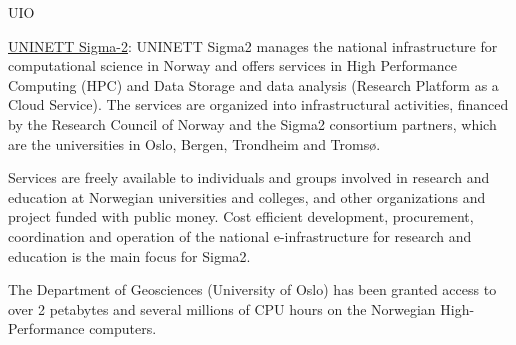 \begin{sitedescription}{UIO}
\begin{compactenum}
\item \href{https://sigma2.no}{UNINETT Sigma-2}: UNINETT Sigma2 manages the national infrastructure for computational science in Norway and offers services in High Performance Computing (HPC) and Data Storage and data analysis (Research Platform as a Cloud Service). The services are organized into infrastructural activities, financed by the Research Council of Norway and the Sigma2 consortium partners, which are the universities in Oslo, Bergen, Trondheim and Tromsø.

Services are freely available to individuals and groups involved in  research and education at Norwegian universities and colleges, and other organizations and project funded with public money. Cost efficient development, procurement, coordination and operation of the national e-infrastructure for research and education is the main focus for Sigma2.

The Department of Geosciences (University of Oslo) has been granted access to over 2 petabytes and several millions of CPU hours on the Norwegian High-Performance computers.
\end{compactenum}

\end{sitedescription}
